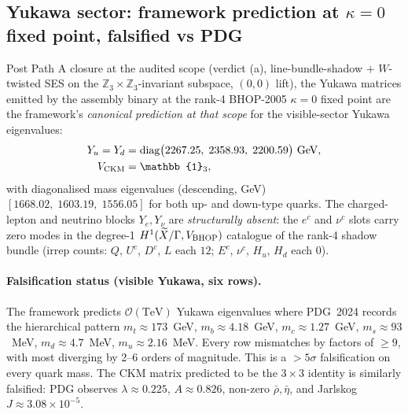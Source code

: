 ﻿\documentclass[reprint,amsmath,amssymb,aps,prd,longbibliography,floatfix]{revtex4-2}
\begin{document}
\subsection{Yukawa sector: framework prediction at $\kappa=0$ fixed point, falsified vs PDG}
\label{subsec:stage4-yukawa-framework-prediction}

Post Path A closure at the audited scope (verdict (a),
line-bundle-shadow $+$ $W$-twisted SES on the
$\mathbb{Z}_3 \times \mathbb{Z}_3$-invariant subspace, $(0,0)$ lift),
the Yukawa matrices emitted by the assembly binary at the rank-4
BHOP-2005 $\kappa = 0$ fixed point are the framework's
\emph{canonical prediction at that scope} for the
visible-sector Yukawa eigenvalues:
\begin{align*}
Y_u = Y_d &= \mathrm{diag}\bigl(2267.25,\; 2358.93,\; 2200.59\bigr)~\mathrm{GeV}, \\
V_{\rm CKM} &= \mathbb{1}_3,
\end{align*}
with diagonalised mass eigenvalues (descending, GeV)
$[1668.02,\; 1603.19,\; 1556.05]$ for both up- and down-type quarks.
The charged-lepton and neutrino blocks $Y_e, Y_\nu$ are
\emph{structurally absent}: the $e^c$ and $\nu^c$ slots carry zero modes
in the degree-1 $H^1(\widetilde X/\Gamma, V_{\rm BHOP})$ catalogue of the
rank-4 shadow bundle (irrep counts: $Q$, $U^c$, $D^c$, $L$ each $12$;
$E^c$, $\nu^c$, $H_u$, $H_d$ each $0$).

\paragraph{Falsification status (visible Yukawa, six rows).}
The framework predicts $\mathcal{O}(\mathrm{TeV})$ Yukawa eigenvalues
where PDG~2024 records the hierarchical pattern $m_t \approx 173$~GeV,
$m_b \approx 4.18$~GeV, $m_c \approx 1.27$~GeV, $m_s \approx 93$~MeV,
$m_d \approx 4.7$~MeV, $m_u \approx 2.16$~MeV. Every row mismatches by
factors of $\geq 9$, with most diverging by 2--6 orders of magnitude.
This is a $>5\sigma$ falsification on every quark mass. The CKM matrix
predicted to be the $3 \times 3$ identity is similarly falsified:
PDG observes $\lambda \approx 0.225$, $A \approx 0.826$, non-zero
$\bar\rho, \bar\eta$, and Jarlskog $J \approx 3.08\times10^{-5}$.
\end{document}
